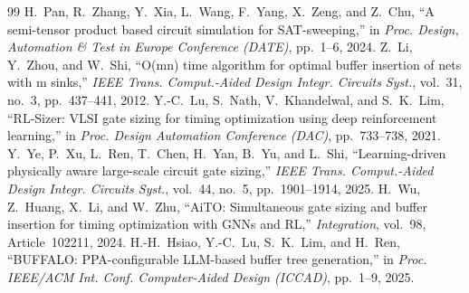 \documentclass[journal]{IEEEtran}
\begin{document}
\begin{thebibliography}{99}
 H.~Pan, R.~Zhang, Y.~Xia, L.~Wang, F.~Yang, X.~Zeng, and Z.~Chu, ``A semi-tensor product based circuit simulation for SAT-sweeping,'' in \emph{Proc. Design, Automation \& Test in Europe Conference (DATE)}, pp.~1--6, 2024.
 Z.~Li, Y.~Zhou, and W.~Shi, ``O(mn) time algorithm for optimal buffer insertion of nets with m sinks,'' \emph{IEEE Trans. Comput.-Aided Design Integr. Circuits Syst.}, vol.~31, no.~3, pp.~437--441, 2012.
 Y.-C.~Lu, S.~Nath, V.~Khandelwal, and S.~K.~Lim, ``RL-Sizer: VLSI gate sizing for timing optimization using deep reinforcement learning,'' in \emph{Proc. Design Automation Conference (DAC)}, pp.~733--738, 2021.
 Y.~Ye, P.~Xu, L.~Ren, T.~Chen, H.~Yan, B.~Yu, and L.~Shi, ``Learning-driven physically aware large-scale circuit gate sizing,'' \emph{IEEE Trans. Comput.-Aided Design Integr. Circuits Syst.}, vol.~44, no.~5, pp.~1901--1914, 2025.
 H.~Wu, Z.~Huang, X.~Li, and W.~Zhu, ``AiTO: Simultaneous gate sizing and buffer insertion for timing optimization with GNNs and RL,'' \emph{Integration}, vol.~98, Article~102211, 2024.
 H.-H.~Hsiao, Y.-C.~Lu, S.~K.~Lim, and H.~Ren, ``BUFFALO: PPA-configurable LLM-based buffer tree generation,'' in \emph{Proc. IEEE/ACM Int. Conf. Computer-Aided Design (ICCAD)}, pp.~1--9, 2025.
\end{thebibliography}
\end{document}
